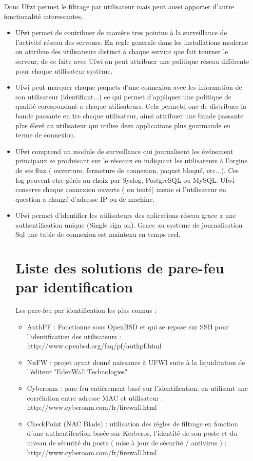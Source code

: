 \documentclass[12pt]{report}
\begin{document}
\newpage
Donc Ufwi permet le filtrage par utilisateur mais peut aussi apporter d'autre fonctionalité interessantes.\newline
\begin{itemize}
    \item Ufwi permet de contribuer de manière tres pointue à la surveillance de l'activité réseau des serveurs. En regle generale dans les installations moderne on attribue des utilisateurs distinct à chaque service que fait tourner le serveur, de ce faite avec Ufwi on peut attribuer une politique réseau différente pour chaque utilisateur système.\newline
    \item Ufwi peut marquer chaque paquets d'une connexion avec les information de son utilisateur (identifiant...) ce qui permet d'appliquer une politique de qualité corespondant a chaque utilisateurs. Cela permetd onc de distribuer la bande passante en tre chaque utilisateur, ainsi attribuer une bande passante plus élevé au utilisateur qui utilise desn applications plus gourmande en terme de connexion.\newline
    \item Ufwi comprend un module de surveillance qui journalisent les événement principaux se produisant sur le réseaux en indiquant les utilisateurs à l'orgine de ses flux ( ouverture, fermeture de connexion, paquet bloqué, etc...). Ces log peuvent etre gérés au choix par Syslog, PostgreSQL ou MySQL. Ufwi conserve chaque connexion ouverte ( ou tenté) meme si l'utilisateur en question a changé d'adresse IP ou de machine.\newline
    \item Ufwi permet d'identifier les utilisateurs des aplications réseau grace a une authentification unique (Single sign on). Grace au systeme de journalisation Sql une table de connexion est maintenu en temps reel.  
\chapter{Liste des solutions de pare-feu par identification}
Les pare-feu par identification les plus connus : 
  \begin{itemize}
    \item AuthPF : Fonctionne sous OpenBSD et qui se repose sur SSH pour l'identification des utilisateurs : http://www.openbsd.org/faq/pf/authpf.html
    \item NuFW : projet ayant donné naissance à UFWI suite à la liquiditation de l'éditeur "EdenWall Technologies"
    \item Cyberoam : pare-feu entièrement basé sur l'identification, en utilisant une corrélation entre adresse MAC et utilisateur : http://www.cyberoam.com/fr/firewall.html
    \item CheckPoint (NAC Blade) : utilisation des règles de filtrage en fonction d'une authentifcation basée sur Kerberos, l'identité de son poste et du niveau de sécurité du poste ( mise à jour de sécurité / antivirus ) : http://www.cyberoam.com/fr/firewall.html
    

\end{itemize}
\end{itemize}
\end{document}
